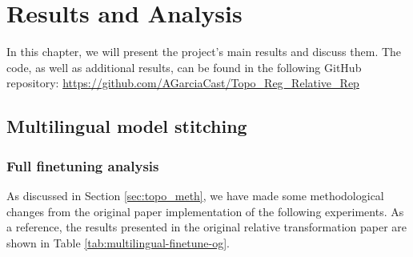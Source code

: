 \documentclass[../main.tex]{subfiles}
\begin{document}
\chapter{Results and Analysis}
\label{ch:resultsAndAnalysis}


In this chapter, we will present the project's main results and discuss them. The code, as well as additional results, can be found in the following GitHub repository: \url{https://github.com/AGarciaCast/Topo_Reg_Relative_Rep}
\section{Multilingual model stitching}

\subsection{Full finetuning analysis}

As discussed in Section \ref{sec:topo_meth}, we have made some methodological changes from the original paper implementation of the following experiments. As a reference, the results presented in the original relative transformation paper are shown in Table \ref{tab:multilingual-finetune-og}.
\end{document}
